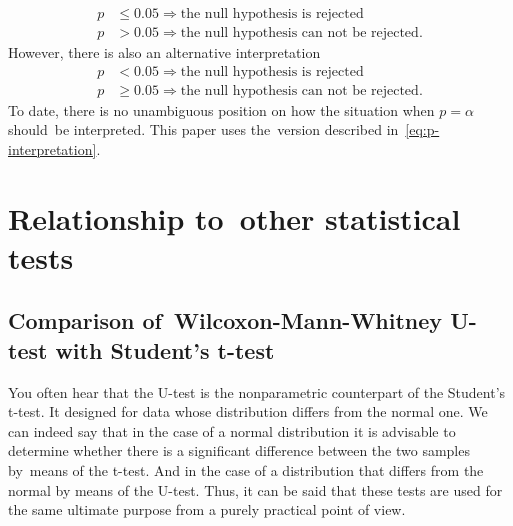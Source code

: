 \documentclass[]{scrreprt}
\begin{document}
\begin{equation}\label{eq:p-interpretation}
\begin{aligned}
p &\leq 0.05 \Rightarrow \text{the~null hypothesis is~rejected}\\
p &> 0.05 \Rightarrow \text{the~null hypothesis can~not~be rejected}.
\end{aligned}
\end{equation}
However, there is also an alternative interpretation
\begin{equation}\label{eq:p-interpretation-2}
\begin{aligned}
p &< 0.05 \Rightarrow \text{the~null hypothesis is~rejected}\\
p &\geq 0.05 \Rightarrow \text{the~null hypothesis can~not~be rejected}.
\end{aligned}
\end{equation}
To date, there is no unambiguous position on how the situation when $p = \alpha$ should~be interpreted. This paper uses the~version described in~\ref{eq:p-interpretation}.
%
\section{Relationship to~other statistical tests}
\subsection{Comparison of~Wilcoxon-Mann-Whitney U-test with Student's t-test}
You often hear that the U-test is the nonparametric counterpart of the Student's t-test. It designed for data whose distribution differs from the normal one. We can indeed say that in the case of a normal distribution it is advisable to determine whether there is a significant difference between the two samples by~means of the t-test. And in the case of a distribution that differs from the normal by means of the U-test. Thus, it can be said that these tests are used for the same ultimate purpose from a purely practical point of view.
\end{document}
